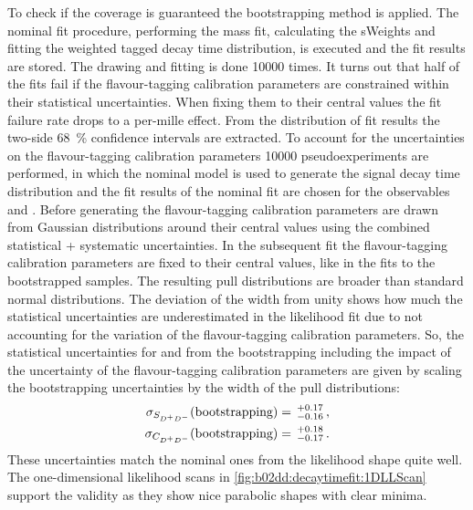 To check if the coverage is guaranteed the bootstrapping method is applied.
The nominal fit procedure, \ie performing the mass fit, calculating the
sWeights and fitting the weighted tagged decay time distribution, is executed
and the fit results are stored. The drawing and fitting is done \num{10000}
times. It turns out that half of the fits fail if the flavour-tagging
calibration parameters are constrained within their statistical uncertainties.
When fixing them to their central values the fit failure rate drops to a
per-mille effect. From the distribution of fit results the two-side
\SI{68}{\percent} confidence intervals are extracted. To account for the
uncertainties on the flavour-tagging calibration parameters \num{10000}
pseudoexperiments are performed, in which the nominal model is used to
generate the signal decay time distribution and the fit results of the nominal
fit are chosen for the \CP observables \SDD and \CDD. Before generating the
flavour-tagging calibration parameters are drawn from Gaussian distributions
around their central values using the combined statistical + systematic
uncertainties. In the subsequent fit the flavour-tagging calibration
parameters are fixed to their central values, like in the fits to the
bootstrapped samples. The resulting pull distributions are broader than
standard normal distributions. The deviation of the width from unity shows how
much the statistical uncertainties are underestimated in the likelihood fit
due to not accounting for the variation of the flavour-tagging calibration
parameters. So, the statistical uncertainties for \SDD and \CDD from the
bootstrapping including the impact of the uncertainty of the flavour-tagging
calibration parameters are given by scaling the bootstrapping uncertainties by
the width of the pull distributions:
\begin{align}
\begin{split}
    \sigma_{S_{{{D}^+}{{D}^-}}}(\text{bootstrapping}) &= \,^{+0.17}_{-0.16} \,, \\
    \sigma_{C_{{{D}^+}{{D}^-}}}(\text{bootstrapping}) &= \,^{+0.18}_{-0.17} \,.
\end{split}
\end{align}
These uncertainties match the nominal ones from the likelihood shape quite
well. The one-dimensional likelihood scans in
\cref{fig:b02dd:decaytimefit:1DLLScan} support the validity as they show nice
parabolic shapes with clear minima.
